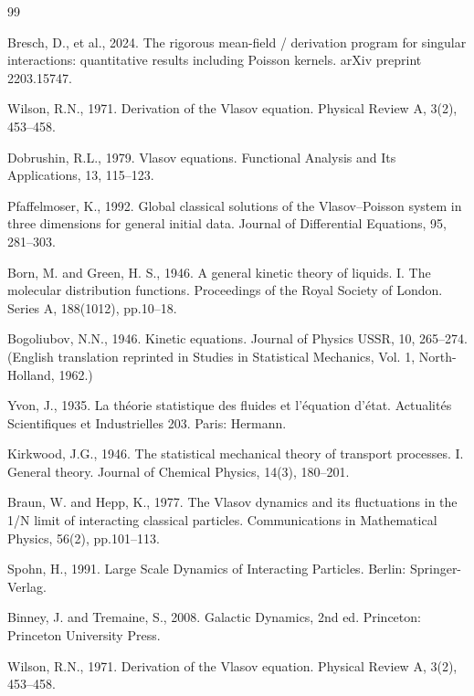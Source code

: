 \documentclass[12pt,a4paper]{article}
\numberwithin{equation}{section}
\begin{document}
\begin{thebibliography}{99}
\item Bresch, D., et al., 2024. The rigorous mean-field / derivation program for singular interactions: quantitative results including Poisson kernels. arXiv preprint 2203.15747.

\item Wilson, R.N., 1971. Derivation of the Vlasov equation. Physical Review A, 3(2), 453–458.

\item Dobrushin, R.L., 1979. Vlasov equations. Functional Analysis and Its Applications, 13, 115–123.

\item Pfaffelmoser, K., 1992. Global classical solutions of the Vlasov–Poisson system in three dimensions for general initial data. Journal of Differential Equations, 95, 281–303.

\item Born, M. and Green, H. S., 1946. A general kinetic theory of liquids. I. The molecular distribution functions. Proceedings of the Royal Society of London. Series A, 188(1012), pp.10–18.

\item Bogoliubov, N.N., 1946. Kinetic equations. Journal of Physics USSR, 10, 265–274. (English translation reprinted in Studies in Statistical Mechanics, Vol. 1, North-Holland, 1962.)

\item Yvon, J., 1935. La théorie statistique des fluides et l’équation d’état. Actualités Scientifiques et Industrielles 203. Paris: Hermann.

\item Kirkwood, J.G., 1946. The statistical mechanical theory of transport processes. I. General theory. Journal of Chemical Physics, 14(3), 180–201.

\item Braun, W. and Hepp, K., 1977. The Vlasov dynamics and its fluctuations in the 1/N limit of interacting classical particles. Communications in Mathematical Physics, 56(2), pp.101–113.

\item Spohn, H., 1991. Large Scale Dynamics of Interacting Particles. Berlin: Springer-Verlag.

\item Binney, J. and Tremaine, S., 2008. Galactic Dynamics, 2nd ed. Princeton: Princeton University Press.

\item Wilson, R.N., 1971. Derivation of the Vlasov equation. Physical Review A, 3(2), 453–458.


\end{thebibliography}
\end{document}
